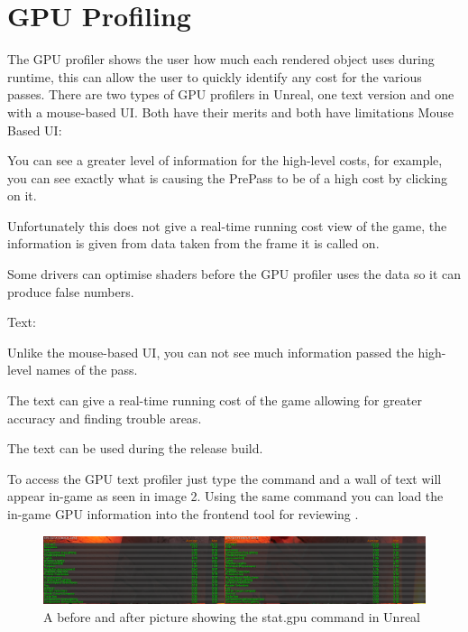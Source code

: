 \documentclass{scrartcl}
\begin{document}
\section{GPU Profiling}
The GPU profiler shows the user how much each rendered object uses during runtime, this can allow the user to quickly identify any cost for the various passes. There are two types of GPU profilers in Unreal, one text version and one with a mouse-based UI. Both have their merits and both have limitations
\newline
Mouse Based UI:
\begin{description}[font=$\bullet$~\normalfont\scshape\color{red!50!black}]
	\item You can see a greater level of information for the high-level costs, for example, you can see exactly what is causing the PrePass to be of a high cost by clicking on it.
	\item Unfortunately this does not give a real-time running cost view of the game, the information is given from data taken from the frame it is called on.
	\item Some drivers can optimise shaders before the GPU profiler uses the data so it can produce false numbers.
\end{description}

Text:
\begin{description}[font=$\bullet$~\normalfont\scshape\color{red!50!black}]
	\item Unlike the mouse-based UI, you can not see much information passed the high-level names of the pass.
	\item The text can give a real-time running cost of the game allowing for greater accuracy and finding trouble areas.
	\item The text can be used during the release build.
\end{description}

To access the GPU text profiler just type the command  and a wall of text will appear in-game as seen in image 2. Using the same  command you can load the in-game GPU information into the frontend tool for reviewing \cite{UEGPU}.

\begin{figure}[h]
	\centering
	\includegraphics[width=\textwidth]{Image2}
	\caption{A before and after picture showing the stat.gpu command in Unreal}
	\label{Image2}
\end{figure}
\end{document}
